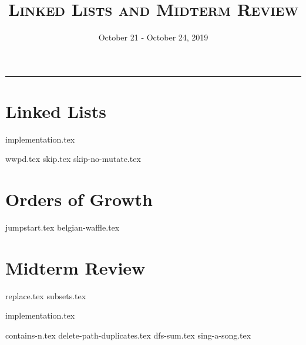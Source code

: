 \documentclass{exam}
\title{\textsc{Linked Lists and Midterm Review}}
\date{October 21 - October 24, 2019}
\begin{document}
\maketitle
\rule{\textwidth}{0.15em}
\fontsize{12}{15}\selectfont

\section{Linked Lists}
{implementation.tex}
\newpage
\begin{questions}
{wwpd.tex}
\newpage
{skip.tex}
{skip-no-mutate.tex}
\end{questions}
\newpage

\section{Orders of Growth}
\begin{questions}
{jumpstart.tex}
{belgian-waffle.tex}
\end{questions}

\section{Midterm Review}
\begin{questions}
{replace.tex}
{subsets.tex}
\end{questions}
\newpage
{implementation.tex}
\vspace{\baselineskip}
\begin{questions}
{contains-n.tex}
{delete-path-duplicates.tex}
\newpage
{dfs-sum.tex}
{sing-a-song.tex}

\end{questions}
\end{document}
